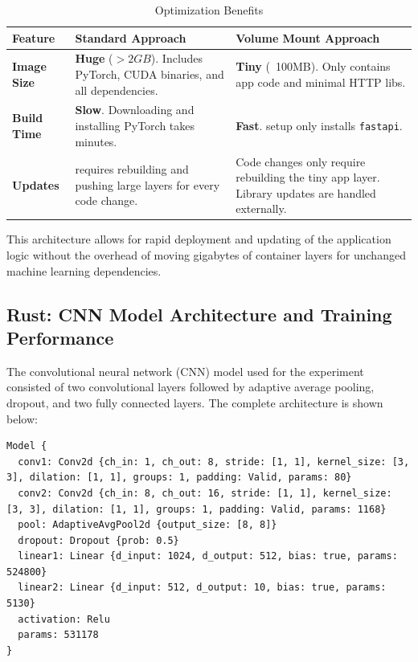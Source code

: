 \documentclass{ieeeaccess}
\begin{document}
\begin{table}[t!]
\centering
\caption{Optimization Benefits} 
\label{tab:docker_optimization}
\begin{tabular}{|l|p{6cm}|p{6cm}|}
\hline
\textbf{Feature} & \textbf{Standard Approach} & \textbf{Volume Mount Approach} \\ \hline
\textbf{Image Size} & \textbf{Huge} ($>2GB$). Includes PyTorch, CUDA binaries, and all dependencies. & \textbf{Tiny} (~100MB). Only contains app code and minimal HTTP libs. \\ \hline
\textbf{Build Time} & \textbf{Slow}. Downloading and installing PyTorch takes minutes. & \textbf{Fast}. setup only installs \texttt{fastapi}. \\ \hline
\textbf{Updates} & requires rebuilding and pushing large layers for every code change. & Code changes only require rebuilding the tiny app layer. Library updates are handled externally. \\ \hline
\end{tabular}
\end{table}

This architecture allows for rapid deployment and updating of the application logic without the overhead of moving gigabytes of container layers for unchanged machine learning dependencies.

\subsection{Rust: CNN Model Architecture and Training Performance}

The convolutional neural network (CNN) model used for the experiment consisted of two convolutional layers followed by adaptive average pooling, dropout, and two fully connected layers. The complete architecture is shown below:

\begin{lstlisting}
Model {
  conv1: Conv2d {ch_in: 1, ch_out: 8, stride: [1, 1], kernel_size: [3, 3], dilation: [1, 1], groups: 1, padding: Valid, params: 80}
  conv2: Conv2d {ch_in: 8, ch_out: 16, stride: [1, 1], kernel_size: [3, 3], dilation: [1, 1], groups: 1, padding: Valid, params: 1168}
  pool: AdaptiveAvgPool2d {output_size: [8, 8]}
  dropout: Dropout {prob: 0.5}
  linear1: Linear {d_input: 1024, d_output: 512, bias: true, params: 524800}
  linear2: Linear {d_input: 512, d_output: 10, bias: true, params: 5130}
  activation: Relu
  params: 531178
}
\end{lstlisting}
\end{document}
